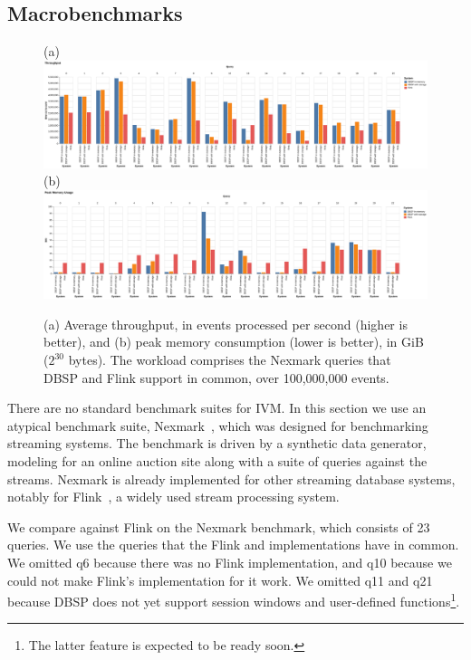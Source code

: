 \subsection{Macrobenchmarks}\label{sec:macrobenchmarks}

\begin{figure}
  (a) \includegraphics[width=.95\textwidth]{graph/throughput} \\
  (b) \includegraphics[width=.95\textwidth]{graph/memory} \\
  \caption{(a) Average throughput, in events processed per second
    (higher is better), and (b) peak memory consumption (lower is
    better), in GiB (\(2^{30}\) bytes).  The workload comprises the
    Nexmark queries that DBSP and Flink support in common, over
    100,000,000 events.\label{fig:macrobenchmark}}
\end{figure}

\newcommand{\query}[1]{\textsf{#1}}

There are no standard benchmark suites for IVM.  In this section we
use an atypical benchmark suite, Nexmark~\cite{tucker2008nexmark},
which was designed for benchmarking streaming systems.  The benchmark
is driven by a synthetic data generator, modeling for an online
auction site along with a suite of queries against the streams.
Nexmark is already implemented for other streaming database systems,
notably for Flink~\cite{carbone-ieee15,nexmark-flink}, a widely used
stream processing system.

We compare \dbsp against Flink on the Nexmark benchmark, which
consists of 23 queries.  We use the queries that the Flink and \dbsp
implementations have in common.  We omitted \query{q6} because there
was no Flink implementation, and \query{q10} because we could not make
Flink's implementation for it work.  We omitted \query{q11} and
\query{q21} because DBSP does not yet support session windows and
user-defined functions\footnote{The latter feature is expected to be
ready soon.}.

